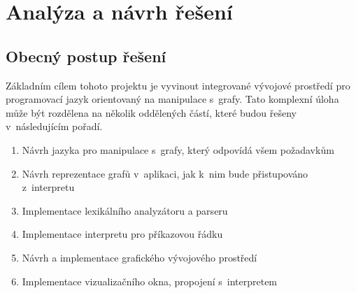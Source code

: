 \documentclass[11pt,twoside,a4paper]{book}
\begin{document}
%
%



\chapter{Analýza a návrh řešení}


\section{Obecný postup řešení}

Základním cílem tohoto projektu je vyvinout integrované vývojové prostředí pro programovací jazyk orientovaný na manipulace s~grafy. Tato komplexní úloha může být rozdělena na několik oddělených částí, které budou řešeny v~následujícím pořadí.

\begin{enumerate}
\item Návrh jazyka pro manipulace s~grafy, který odpovídá všem požadavkům
\item Návrh reprezentace grafů v~aplikaci, jak k~nim bude přistupováno z~interpretu
\item Implementace lexikálního analyzátoru a parseru
\item Implementace interpretu pro příkazovou řádku
\item Návrh a implementace grafického vývojového prostředí
\item Implementace vizualizačního okna, propojení s~interpretem
\end{enumerate}
\end{document}
